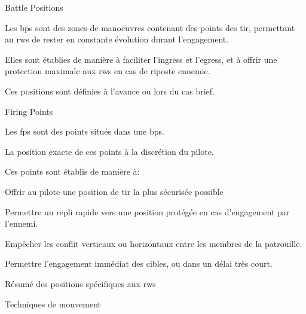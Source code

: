 	\item Battle Positions

	\ee
	    \item Les \glspl{bp} sont des zones de manoeuvres contenant des points des tir, permettant au \glspl{rw} de rester en constante évolution durant l'engagement.
	    \item Elles sont établies de manière à faciliter l'ingress et l'egress, et à offrir une protection maximale aux \glspl{rw} en cas de riposte ennemie.
	    \item Ces positions sont définies à l'avance ou lors du \gls{cas} brief.
	\ed

	\item Firing Points

	\ee
	    \item Les \glspl{fp} sont des points situés dans une \glspl{bp}.
	    \item La position exacte de ces points à la discrétion du pilote.
	    \item Ces points sont établis de manière à:
	    \eee
	        \item Offrir au pilote une position de tir la plus sécurisée possible
	        \item Permettre un repli rapide vers une position protégée en cas d'engagement par l'ennemi.
	        \item Empêcher les conflit verticaux ou horizontaux entre les membres de la patrouille.
	        \item Permettre l'engagement immédiat des cibles, ou dans un délai très court.
	    \ed
	\ed
	\item Résumé des positions spécifiques aux \glspl{rw}

	\item Techniques de mouvement

